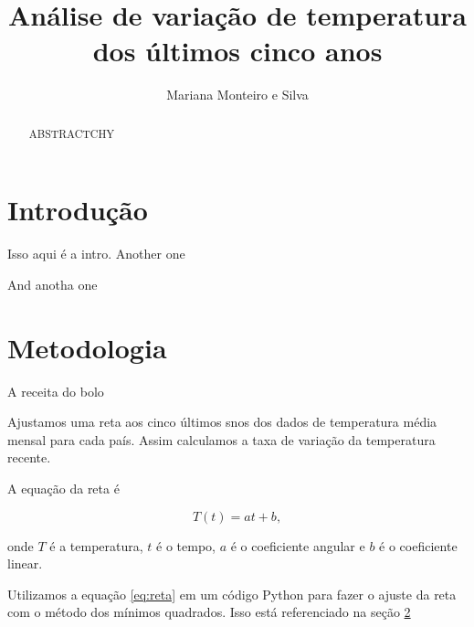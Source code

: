 \documentclass{article} %
\begin{document}
\title{Análise de variação de temperatura dos últimos cinco anos}
\author{Mariana Monteiro e Silva}
\maketitle



\begin{abstract}
ABSTRACTCHY

\end{abstract}

\section{Introdução}
\label{sec:intro}
Isso aqui é a intro.
Another one

And anotha one

\section{Metodologia}
\label{sec:metodos}

A receita do bolo

Ajustamos uma reta aos cinco últimos snos dos dados
de temperatura média mensal para cada país.
Assim calculamos a taxa de variação da temperatura recente.

A equação da reta é

\begin{equation}
T(t) = at + b,
\label{eq:reta}
\end{equation}

\noindent
onde $T$ é a temperatura, $t$ é o tempo, $a$ é o coeficiente angular 
e $b$ é o coeficiente linear.

Utilizamos a equação \ref{eq:reta} em um código Python para fazer 
o ajuste da reta com o método dos mínimos quadrados. Isso está referenciado na seção \ref{sec:metodos}
\end{document}
